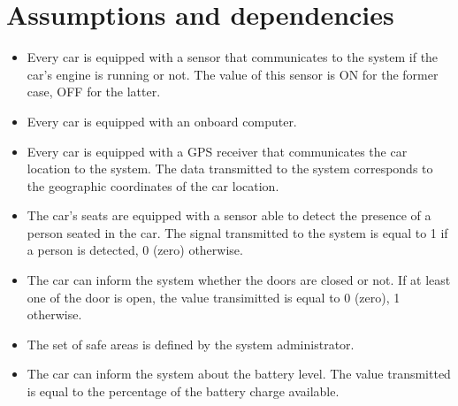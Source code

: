\section{Assumptions and dependencies}

\begin{itemize}
	\item Every car is equipped with a sensor that communicates to the system if the car's engine is running or not. The value of this sensor is ON for the former case, OFF for the latter.
	\item Every car is equipped with an onboard computer.
	\item Every car is equipped with a GPS receiver that communicates the car location to the system. The data transmitted to the system corresponds to the geographic coordinates of the car location.
	\item The car's seats are equipped with a sensor able to detect the presence of a person seated in the car. The signal transmitted to the system is equal to 1 if a person is detected, 0 (zero) otherwise.
	\item The car can inform the system whether the doors are closed or not. If at least one of the door is open, the value transimitted is equal to 0 (zero), 1 otherwise.
	\item The set of safe areas is defined by the system administrator.
	\item The car can inform the system about the battery level. The value transmitted is equal to the percentage of the battery charge available.
\end{itemize}